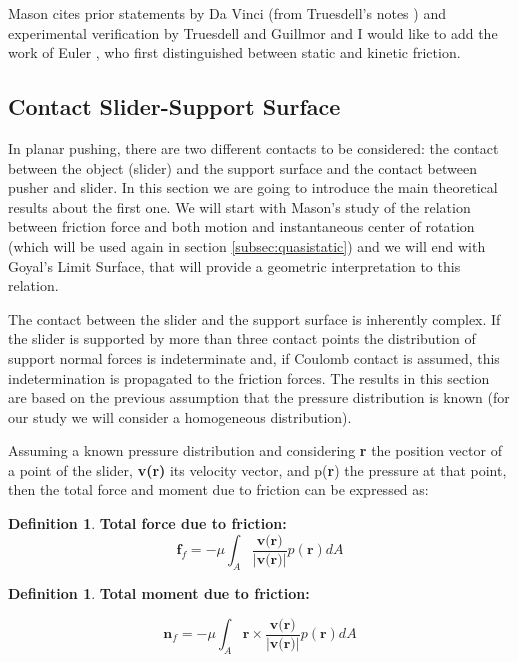 \documentclass[12,twoside]{TFG-GM}
\theoremstyle{definition}
\newtheorem{definition}[theorem]{Definition}
\theoremstyle{remark}
\begin{document}
Mason cites prior statements by Da Vinci (from Truesdell's notes \cite{da_vinci}) and experimental verification by Truesdell and Guillmor \cite{gillmor} and I would like to add the work of Euler \cite{euler}, who first distinguished between static and kinetic friction.

\subsection{Contact Slider-Support Surface}
\label{subsec:planar_sliding}
In planar pushing, there are two different contacts to be considered: the contact between the object (slider) and the support surface and the contact between pusher and slider. In this section we are going to introduce the main theoretical results about the first one. We will start with Mason's study of the relation between friction force and both motion and instantaneous center of rotation (which will be used again in section \ref{subsec:quasistatic}) and we will end with Goyal's Limit Surface, that will provide a geometric interpretation to this relation.

The contact between the slider and the support surface is inherently complex. If the slider is supported by more than three contact points the distribution of support normal forces is indeterminate and, if Coulomb contact is assumed, this indetermination is propagated to the friction forces. The results in this section are based on the previous assumption that the pressure distribution is known (for our study we will consider a homogeneous distribution).

Assuming a known pressure distribution and considering \textbf{r} the position vector of a point of the slider, \textbf{v(r)} its velocity vector, and p(\textbf{r}) the pressure at that point, then the total force and moment due to friction can be expressed as:
\begin{definition} \textbf{Total force due to friction:} 
\begin{equation}
\textbf{f}_f = - \mu \int_A \dfrac{\textbf{v(r)}}{|\textbf{v(r)}|} p(\textbf{r}) dA
\end{equation}
\end{definition}
\begin{definition} \textbf{Total moment due to friction:}

\begin{equation}
\textbf{n}_f = - \mu \int_A \textbf{r} \times \dfrac{\textbf{v(r)}}{|\textbf{v(r)}|} p(\textbf{r}) dA
\end{equation}
\end{definition}
\end{document}
